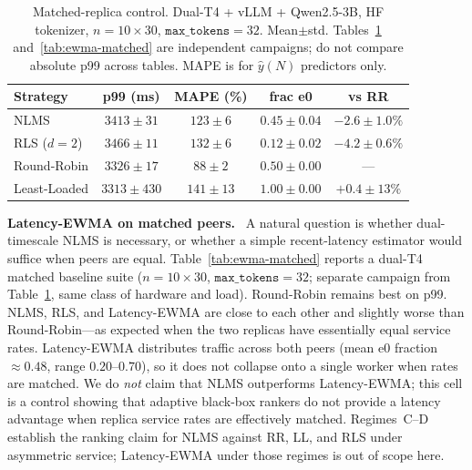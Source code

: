 \documentclass[pdflatex,sn-mathphys-num]{sn-jnl}
\renewcommand{\paragraph}[1]{\par\smallskip\noindent\textbf{#1.}\ }
\begin{document}
\begin{table}[ht]
\caption{Matched-replica control. Dual-T4 + vLLM + Qwen2.5-3B, HF tokenizer,
$n{=}10\times 30$, $\texttt{max\_tokens}{=}32$. Mean$\pm$std.
Tables~\ref{tab:regimeA} and~\ref{tab:ewma-matched} are independent campaigns;
do not compare absolute p99 across tables. MAPE is for $\hat{y}(N)$ predictors only.}
\label{tab:regimeA}
\centering
\begin{tabular}{@{}lcccc@{}}
\toprule
Strategy & p99 (ms) & MAPE (\%) & frac e0 & vs RR \\
\midrule
NLMS & $3413\pm31$ & $123\pm6$ & $0.45\pm0.04$ & $-2.6\pm1.0\%$ \\
RLS ($d{=}2$) & $3466\pm11$ & $132\pm6$ & $0.12\pm0.02$ & $-4.2\pm0.6\%$ \\
Round-Robin & $3326\pm17$ & $88\pm2$ & $0.50\pm0.00$ & --- \\
Least-Loaded & $3313\pm430$ & $141\pm13$ & $1.00\pm0.00$ & $+0.4\pm13\%$ \\
\bottomrule
\end{tabular}
\end{table}

\paragraph{Latency-EWMA on matched peers}
A natural question is whether dual-timescale NLMS is necessary, or whether a
simple recent-latency estimator would suffice when peers are equal.
Table~\ref{tab:ewma-matched} reports a dual-T4 matched baseline suite
($n{=}10\times 30$, $\texttt{max\_tokens}{=}32$; separate campaign from
Table~\ref{tab:regimeA}, same class of hardware and load). Round-Robin remains
best on p99. NLMS, RLS, and Latency-EWMA are close to each other and slightly worse
than Round-Robin---as expected when the two replicas have essentially equal service
rates. Latency-EWMA distributes traffic across both peers (mean e0 fraction
$\approx0.48$, range $0.20$--$0.70$), so it does not collapse onto a single worker
when rates are matched. We do \emph{not} claim that NLMS outperforms Latency-EWMA;
this cell is a control showing that adaptive black-box rankers do not provide a
latency advantage when replica service rates are effectively matched.
Regimes~C--D establish the ranking claim for NLMS against RR, LL, and RLS under
asymmetric service; Latency-EWMA under those regimes is out of scope here.
\end{document}

